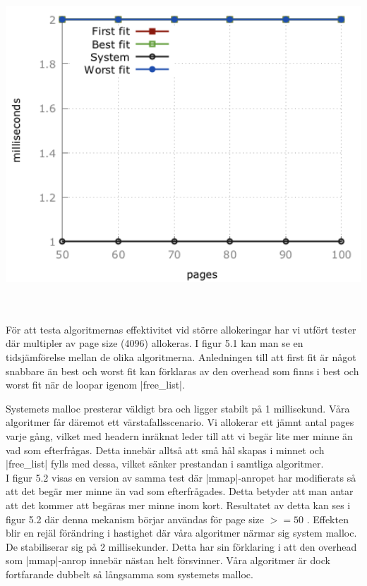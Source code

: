 \documentclass[paper=a4, fontsize=11pt]{scrartcl} %
\numberwithin{equation}{section} %
\numberwithin{figure}{section} %
\numberwithin{table}{section} %
\begin{document}
\begin{minipage}{.3\textwidth}
    \centering
    \includegraphics[width=1\textwidth]{images/time_plot_big3.png}
    \label{fig:big3}
\end{minipage}\\\\

För att testa algoritmernas effektivitet vid större allokeringar har vi utfört
tester där multipler av page size (4096) allokeras. I figur 5.1 kan man se en
tidsjämförelse mellan de olika algoritmerna. Anledningen till att first fit är 
något snabbare än best och worst fit kan förklaras av den overhead som finns i 
best och worst fit när de loopar igenom |free_list|.

Systemets malloc presterar väldigt bra och ligger stabilt på 1 millisekund.
Våra algoritmer får däremot ett värstafallsscenario. Vi allokerar ett jämnt
antal pages varje gång, vilket med headern inräknat leder till att vi begär
lite mer minne än vad som efterfrågas. Detta innebär alltså att små hål
skapas i minnet och |free_list| fylls med dessa, vilket sänker prestandan
i samtliga algoritmer.\\

I figur 5.2 visas en version av samma test där |mmap|-anropet har modifierats
så att det begär mer minne än vad som efterfrågades. Detta betyder att man 
antar att det kommer att begäras mer minne inom kort. Resultatet av detta kan
ses i figur 5.2 där denna mekanism börjar användas för page size $>= 50$ .
Effekten blir en rejäl förändring i hastighet där våra algoritmer närmar sig
system malloc. De stabiliserar sig på 2 millisekunder. Detta har sin förklaring
i att den overhead som |mmap|-anrop innebär nästan helt försvinner.
Våra algoritmer är dock fortfarande dubbelt så långsamma som systemets malloc.\\
\end{document}
